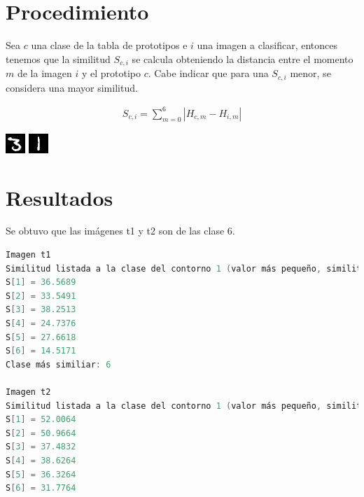 \documentclass[10pt]{IEEEtran}
\begin{document}
  \section{Procedimiento}
  Sea $c$ una clase de la tabla de prototipos e $i$ una imagen a clasificar, entonces tenemos que la similitud
  $S_{c,i}$ se calcula obteniendo la distancia entre el momento $m$ de la imagen $i$ y el prototipo $c$.
  Cabe indicar que para una $S_{c,i}$ menor, se considera una mayor similitud.

  \begin{equation}
  \begin{aligned}
    S_{c,i} = \sum_{m=0}^{6} {|H_{c,m} - H_{i,m}|}
  \end{aligned}
  \end{equation}

  \includegraphics[width=0.4\linewidth]{t1.jpg}
  \includegraphics[width=0.4\linewidth]{t2.jpg}

  \section{Resultados}
  Se obtuvo que las imágenes t1 y t2 son de las clase 6.
  \begin{lstlisting}[language=C]
Imagen t1
Similitud listada a la clase del contorno 1 (valor más pequeño, similitud mayor):
S[1] = 36.5689
S[2] = 33.5491
S[3] = 38.2513
S[4] = 24.7376
S[5] = 27.6618
S[6] = 14.5171
Clase más similiar: 6

Imagen t2
Similitud listada a la clase del contorno 1 (valor más pequeño, similitud mayor):
S[1] = 52.0064
S[2] = 50.9664
S[3] = 37.4832
S[4] = 38.6264
S[5] = 36.3264
S[6] = 31.7764
  \end{lstlisting}
\end{document}

